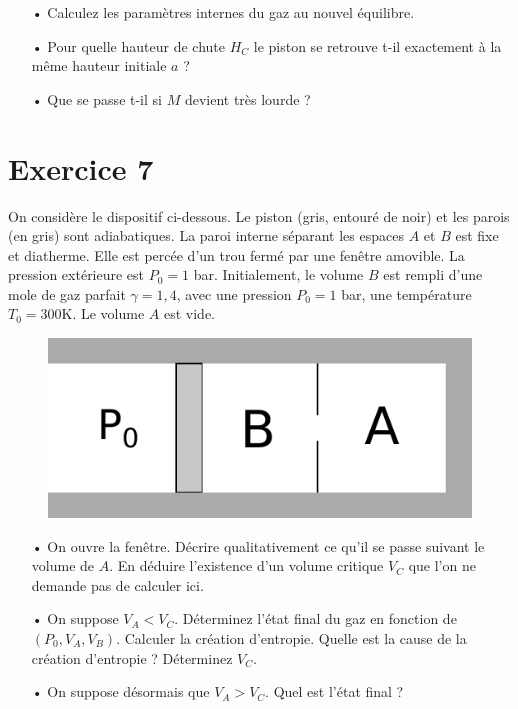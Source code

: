 \documentclass{report}
\begin{document}
\begin{itemize}
\item[•] Calculez les paramètres internes du gaz au nouvel équilibre. 
\item[•] Pour quelle hauteur de chute $H_C$ le piston se retrouve t-il exactement à la même hauteur initiale $a$ ?
\item[•] Que se passe t-il si $M$ devient très lourde ?
\end{itemize}

\newpage

\section*{Exercice 7}

On considère le dispositif ci-dessous. Le piston (gris, entouré de noir) et les parois (en gris) sont adiabatiques. La paroi interne séparant les espaces $A$ et $B$ est fixe et diatherme. Elle est percée d'un trou fermé par une fenêtre amovible. La pression extérieure est $P_0=1$ bar. Initialement, le volume $B$ est rempli d'une mole de gaz parfait $\gamma=1,4$, avec une pression $P_0=1$ bar, une température $T_0=300$K. Le volume $A$ est vide.

\begin{figure}[!h]
\centering
\includegraphics[width=0.5\linewidth]{thermo1.pdf}
\end{figure}

\begin{itemize}
\item[•] On ouvre la fenêtre. Décrire qualitativement ce qu'il se passe suivant le volume de $A$. En déduire l'existence d'un volume critique $V_C$ que l'on ne demande pas de calculer ici.

\item[•] On suppose $V_A<V_C$. Déterminez l'état final du gaz en fonction de $(P_0, V_A, V_B)$. Calculer la création d'entropie. Quelle est la cause de la création d'entropie ? Déterminez $V_C$.

\item[•] On suppose désormais que $V_A>V_C$. Quel est l'état final ?

\end{itemize}
\end{document}

